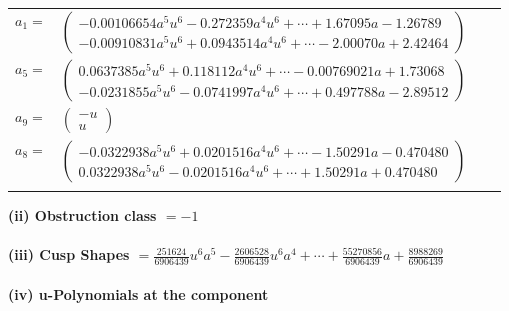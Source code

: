 \documentclass[1p]{elsarticle_modified}
\theoremstyle{definition}
\begin{document}
\begin{tabular}{m{7pt} m{180pt} m{7pt} m{180pt} }
\flushright $a_{1}=$&$\begin{pmatrix}-0.00106654 a^{5} u^{6}-0.272359 a^{4} u^{6}+\cdots+1.67095 a-1.26789\\-0.00910831 a^{5} u^{6}+0.0943514 a^{4} u^{6}+\cdots-2.00070 a+2.42464\end{pmatrix}$ \\
\flushright $a_{5}=$&$\begin{pmatrix}0.0637385 a^{5} u^{6}+0.118112 a^{4} u^{6}+\cdots-0.00769021 a+1.73068\\-0.0231855 a^{5} u^{6}-0.0741997 a^{4} u^{6}+\cdots+0.497788 a-2.89512\end{pmatrix}$ \\
\flushright $a_{9}=$&$\begin{pmatrix}- u\\u\end{pmatrix}$ \\
\flushright $a_{8}=$&$\begin{pmatrix}-0.0322938 a^{5} u^{6}+0.0201516 a^{4} u^{6}+\cdots-1.50291 a-0.470480\\0.0322938 a^{5} u^{6}-0.0201516 a^{4} u^{6}+\cdots+1.50291 a+0.470480\end{pmatrix}$\\&\end{tabular}
\flushleft \textbf{(ii) Obstruction class $= -1$}\\~\\
\flushleft \textbf{(iii) Cusp Shapes $= \frac{251624}{6906439} u^6 a^5-\frac{2606528}{6906439} u^6 a^4+\cdots+\frac{55270856}{6906439} a+\frac{8988269}{6906439}$}\\~\\
\newpage\renewcommand{\arraystretch}{1}
\flushleft \textbf{(iv) u-Polynomials at the component}\newline \\
\end{document}
